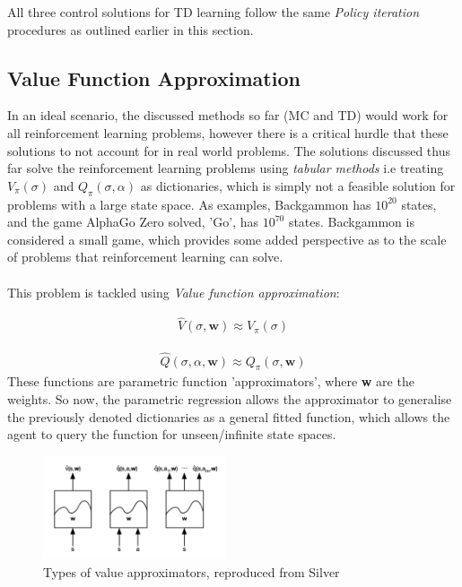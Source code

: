 \documentclass[ %
                    author={Ashwinder Khurana},
                supervisor={Prof Dave Cliff},
                    degree={MEng},
                     title={The Deeply Reinforced Trader},
                  subtitle={},
                      type={enterprise},
                      year={2020} ]{dissertation}
\begin{document}
{\noindent
All three control solutions for TD learning follow the same \textit{Policy iteration} procedures as outlined earlier in this section. 

\subsection{Value Function Approximation}
\label{subsection:value-function-approx}
In an ideal scenario, the discussed methods so far (MC and TD) would work for all reinforcement learning problems, however there is a critical hurdle that these solutions to not account for in real world problems. The solutions discussed thus far solve the reinforcement learning problems using \textit{tabular methods} i.e treating $V_\pi(\sigma)$ and $Q_\pi(\sigma, \alpha)$ as dictionaries, which is simply not a feasible solution for problems with a large state space. As examples, Backgammon has $10^{20}$ states, and the game AlphaGo Zero solved, 'Go', has $10^{70}$ states. Backgammon is considered a small game, which provides some added perspective as to the scale of problems that reinforcement learning can solve. 
\\
\\
\noindent
This problem is tackled using \textit{Value function approximation}:

\begin{equation}
\label{value-approx}
\begin{split}
\hat{V}(\sigma, \textbf{w}) \approx V_\pi(\sigma)
\end{split}
\end{equation}

\begin{equation}
\label{action-value-approx}
\begin{split}
\hat{Q}(\sigma,\alpha, \textbf{w}) \approx Q_\pi(\sigma, \textbf{w})
\end{split}
\end{equation}
\noindent
These functions are parametric function 'approximators', where \textbf{w} are the weights. So now, the parametric regression allows the approximator to generalise the previously denoted dictionaries as a general fitted function, which allows the agent to query the function for unseen/infinite state spaces. 


\begin{figure}
\begin{center}
  \includegraphics[width=0.48\textwidth]{value-approximators.png}
  \end{center}
  \caption{Types of value approximators, reproduced from Silver \cite{https://www.davidsilver.uk/wp-content/uploads/2020/03/FA.pdf}}
\label{fig:approximators}  
\end{figure}
\noindent

}
\end{document}
